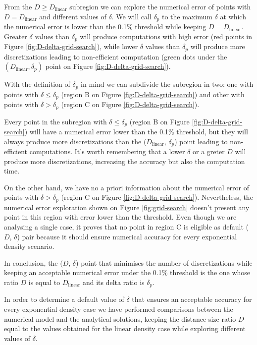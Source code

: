 \documentclass[extra]{gji}
\begin{document}
From the $D \ge D_\text{linear}$ subregion we can explore the numerical 
error of points with $D = D_\text{linear}$ and different values of 
$\delta$.
We will call $\delta_p$ to the maximum $\delta$ at which the numerical 
error is lower than the 0.1\% threshold while keeping
$D = D_ \text{linear}$.
Greater $\delta$ values than $\delta_p$ will produce computations with 
high error (red points in Figure \ref{fig:D-delta-grid-search}), while 
lower $\delta$ values than $\delta_p$ will produce more discretizations 
leading to non-efficient computation (green dots under the 
$(D_\text{linear}, \delta_p)$ point on Figure \ref{fig:D-delta-grid-search}).

With the definition of $\delta_p$ in mind we can subdivide the 
subregion in two: one with points with $\delta \le \delta_p$ (region B 
on Figure \ref{fig:D-delta-grid-search}) and other with points with 
$\delta > \delta_p$ (region C on Figure \ref{fig:D-delta-grid-search}).

Every point in the subregion with $\delta \le \delta_p$ (region B on 
Figure \ref{fig:D-delta-grid-search}) will have a numerical error lower 
than the 0.1\% threshold, but they will always produce more 
discretizations than the ($D_\text{linear}$, $\delta_p$) point leading 
to non-efficient computations.
It's worth remembering that a lower $\delta$ or a greter $D$ will 
produce more discretizations, increasing the accuracy but also the 
computation time.

On the other hand, we have no a priori information about the numerical 
error of points with $\delta > \delta_p$ (region C on 
Figure \ref{fig:D-delta-grid-search}).
Nevertheless, the numerical error exploration shown on
Figure \ref{fig:grid-search} doesn't present any 
point in this region with error lower than the threshold.
Even though we are analysing a single case, it proves that no point in 
region C is eligible as default ($D$, $\delta$) pair because it should 
ensure numerical accuracy for every exponential density scenario.

In conclusion, the ($D$, $\delta$) point that minimises the number of 
discretizations while keeping an acceptable numerical error under the 
0.1\% threshold is the one whose ratio $D$ is equal to 
$D_\text{linear}$ and its delta ratio is $\delta_p$.

In order to determine a default value of $\delta$ that ensures an 
acceptable accuracy for every exponential density case we have 
performed comparisons between the numerical model and the analytical 
solutions, keeping the distance-size ratio $D$ equal to the values 
obtained for the linear density case while exploring different values of 
$\delta$.
\end{document}
